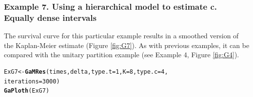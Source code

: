 \documentclass[letterpaper]{article}\usepackage[]{graphicx}\usepackage[]{xcolor}
\makeatletter
\newcommand{\hlnum}[1]{\textcolor[rgb]{0.686,0.059,0.569}{#1}}%
\newcommand{\hlstd}[1]{\textcolor[rgb]{0.345,0.345,0.345}{#1}}%
\newcommand{\hlkwb}[1]{\textcolor[rgb]{0.69,0.353,0.396}{#1}}%
\newcommand{\hlkwc}[1]{\textcolor[rgb]{0.333,0.667,0.333}{#1}}%
\newcommand{\hlkwd}[1]{\textcolor[rgb]{0.737,0.353,0.396}{\textbf{#1}}}%
\newenvironment{kframe}{%
 \def\at@end@of@kframe{}%
 \ifinner\ifhmode%
  \def\at@end@of@kframe{\end{minipage}}%
  \begin{minipage}{\columnwidth}%
 \fi\fi%
 \def\FrameCommand##1{\hskip\@totalleftmargin \hskip-\fboxsep
 \colorbox{shadecolor}{##1}\hskip-\fboxsep
     \hskip-\linewidth \hskip-\@totalleftmargin \hskip\columnwidth}%
 \MakeFramed {\advance\hsize-\width
   \@totalleftmargin\z@ \linewidth\hsize
   \@setminipage}}%
 {\par\unskip\endMakeFramed%
 \at@end@of@kframe}
\newenvironment{knitrout}{}{} %
\makeatother
\begin{document}
\subsubsection{Example 7. Using a hierarchical model to estimate c. Equally dense intervals}

The survival curve for this particular example results in a smoothed version of the Kaplan-Meier estimate (Figure \ref{fig:G7}). As with previous examples, it can be compared with the unitary partition example (see Example 4, Figure \ref{fig:G4}). 

\begin{knitrout}
\color{fgcolor}\begin{kframe}
\begin{alltt}
\hlstd{ExG7} \hlkwb{<-} \hlkwd{GaMRes}\hlstd{(times, delta,} \hlkwc{type.t} \hlstd{=} \hlnum{1}\hlstd{,} \hlkwc{K} \hlstd{=} \hlnum{8}\hlstd{,} \hlkwc{type.c} \hlstd{=} \hlnum{4}\hlstd{,}
               \hlkwc{iterations} \hlstd{=} \hlnum{3000}\hlstd{)}
\hlkwd{GaPloth}\hlstd{(ExG7)}
\end{alltt}
\end{kframe}
\end{knitrout}
\end{document}
